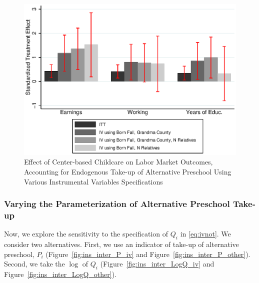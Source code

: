 \begin{appendices}
\begin{figure}[H]
		\caption{Effect of Center-based Childcare on Labor Market Outcomes, Accounting for Endogenous Take-up of Alternative Preschool Using Various Instrumental Variables Specifications} \label{fig:inter_Q_other}
		\includegraphics[width=.7\columnwidth]{output/appendixplots/inter_Q_iv_other.eps}
\end{figure}

\subsubsection{Varying the Parameterization of Alternative Preschool Take-up}

\noindent Now, we explore the sensitivity to the specification of $Q_{i}$ in \eqref{eq:ivnot}. We consider two alternatives. First, we use an indicator of take-up of alternative preschool, $P_{i}$ (Figure~\ref{fig:ins_inter_P_iv} and Figure~\ref{fig:ins_inter_P_other}). Second, we take the $\log$ of $Q_{i}$ (Figure~\ref{fig:ins_inter_LogQ_iv} and Figure~\ref{fig:ins_inter_LogQ_other}).


\end{appendices}
